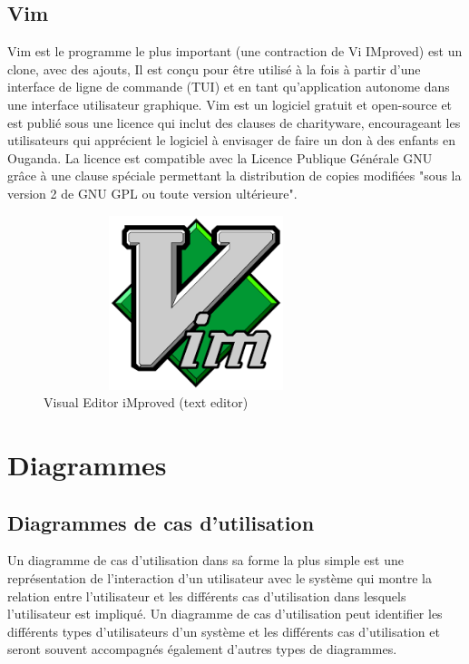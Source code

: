 \documentclass[12pt]{report}
\begin{document}
\subsection{Vim}
Vim est le programme le plus important (une contraction de Vi IMproved) est un clone, avec des ajouts, Il est conçu pour être utilisé à la fois à partir d'une interface de ligne de commande (TUI) et en tant qu'application autonome dans une interface utilisateur graphique. Vim est un logiciel gratuit et open-source et est publié sous une licence qui inclut des clauses de charityware, encourageant les utilisateurs qui apprécient le logiciel à envisager de faire un don à des enfants en Ouganda. La licence est compatible avec la Licence Publique Générale GNU grâce à une clause spéciale permettant la distribution de copies modifiées "sous la version 2 de GNU GPL ou toute version ultérieure".

\vspace{0.2in}

\begin{figure}[h]
\centering
    \includegraphics[width = 3.5in, height = 2in]{../Images/Vim.png}
    \caption{Visual Editor iMproved (text editor)}
\end{figure}

\section{Diagrammes}

\subsection{Diagrammes de cas d'utilisation}

Un diagramme de cas d'utilisation dans sa forme la plus simple est une représentation de l'interaction d'un utilisateur avec le système qui montre la relation entre l'utilisateur et les différents cas d'utilisation dans lesquels l'utilisateur est impliqué. Un diagramme de cas d'utilisation peut identifier les différents types d'utilisateurs d'un système et les différents cas d'utilisation et seront souvent accompagnés également d'autres types de diagrammes.
\end{document}
